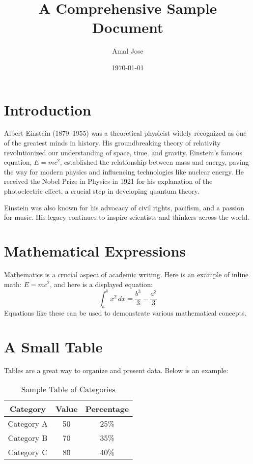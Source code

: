 \documentclass[a4paper]{article} %
\title{A Comprehensive Sample Document} %
\author{Amal Jose} %
\date{\today} %
\begin{document}
    \maketitle %
    
    \section{Introduction}
    Albert Einstein (1879–1955) was a theoretical physicist widely recognized as one of the greatest minds in history. 
    His groundbreaking theory of relativity revolutionized our understanding of space, time, and gravity. 
    Einstein's famous equation, $E=mc^2$, established the relationship between mass and energy, paving the way for modern physics and influencing technologies like nuclear energy. 
    He received the Nobel Prize in Physics in 1921 for his explanation of the photoelectric effect, a crucial step in developing quantum theory.
    
    Einstein was also known for his advocacy of civil rights, pacifism, and a passion for music. His legacy continues to inspire scientists and thinkers across the world.

    \section{Mathematical Expressions}
    Mathematics is a crucial aspect of academic writing. Here is an example of inline math: $E = mc^2$, and here is a displayed equation:
    \begin{equation}
        \int_a^b x^2 \, dx = \frac{b^3}{3} - \frac{a^3}{3}
    \end{equation}
    Equations like these can be used to demonstrate various mathematical concepts.

    \section{A Small Table}
    Tables are a great way to organize and present data. Below is an example:
    \begin{table}[h!]
        \centering
        \begin{tabular}{|c|c|c|}
            \hline
            \textbf{Category} & \textbf{Value} & \textbf{Percentage} \\ \hline
            Category A & 50 & 25\% \\ \hline
            Category B & 70 & 35\% \\ \hline
            Category C & 80 & 40\% \\ \hline
        \end{tabular}
        \caption{Sample Table of Categories}
        \label{tab:sample}
    \end{table}
\end{document}
